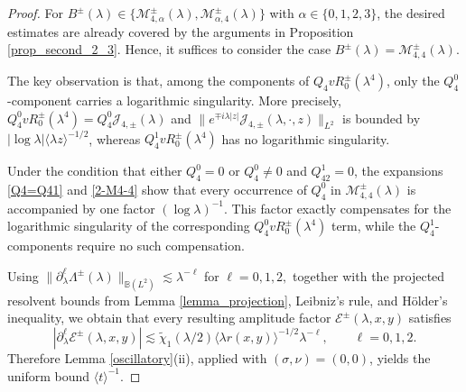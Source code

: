 \documentclass[reqno]{amsart}
\numberwithin{equation}{section}
\begin{document}
\begin{proof}
	For $B^\pm(\lambda) \in \{\mathcal{M}_{4,\alpha}^{\pm}(\lambda), \mathcal{M}_{\alpha, 4}^{\pm}(\lambda)\}$ with $\alpha \in \{0,1,2,3\}$, the desired estimates are already covered by the arguments in Proposition \ref{prop_second_2_3}. Hence, it suffices to consider the  case $B^\pm(\lambda) = \mathcal{M}_{4,4}^{\pm}(\lambda)$.
	
	The key observation is that, among the components of
	$Q_4vR_0^\pm(\lambda^4)$, only the $Q_4^0$-component carries a
	logarithmic singularity. More precisely,
	$
	Q_4^0vR_0^\pm(\lambda^4)
	=
	Q_4^0\mathcal{J}_{4,\pm}(\lambda)
    	$ and 
	 $\| e^{\mp i\lambda|z|}\mathcal{J}_{4,\pm}(\lambda,\cdot,z)\|_{L^2}$ is bounded by $|\log\lambda|\langle\lambda z\rangle^{-1/2}$, whereas
	$Q_4^1vR_0^\pm(\lambda^4)$ has no logarithmic singularity.

    Under the condition that either 
	 $Q_4^0=0$ or $Q_4^0\neq0$ and $Q_{42}^1=0$,  the expansions
\eqref{Q4=Q41} and \eqref{2-M4-4} show that every occurrence of
$Q_4^0$ in $\mathcal{M}_{4,4}^\pm(\lambda)$ is accompanied by one
factor $(\log\lambda)^{-1}$. This factor exactly compensates for
the logarithmic singularity of the corresponding
$Q_4^0vR_0^\pm(\lambda^4)$ term, while the $Q_4^1$-components
require no such compensation.
    
    Using 
	$
	\|
	\partial_\lambda^\ell
	\Lambda^\pm(\lambda)
	\|_{\mathbb{B}(L^2)}
	\lesssim
	\lambda^{-\ell}
	$ for $
	\ell=0,1,2,$
	together with the projected resolvent bounds from Lemma
	\ref{lemma_projection}, Leibniz's rule, and H\"older's inequality, we obtain that every resulting amplitude factor
	$\mathcal{E}^\pm(\lambda,x,y)$ satisfies
	$$
	\left|
	\partial_\lambda^\ell
	\mathcal{E}^\pm(\lambda,x,y)
	\right|
	\lesssim
	\widetilde{\chi}_1(\lambda/2)
	\langle\lambda r(x,y)\rangle^{-1/2}
	\lambda^{-\ell},
	\qquad
	\ell=0,1,2.
	$$
	Therefore Lemma \ref{oscillatory}(ii), applied with
	$(\sigma,\nu)=(0,0)$, yields the uniform bound $\langle t\rangle^{-1}.$
\end{proof}
\end{document}
